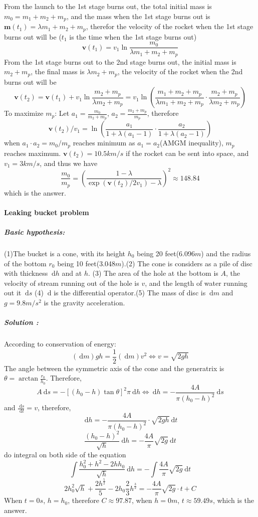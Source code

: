 \documentclass{ctexart}
\newcommand{\df}{\mathrm{~d}}
\begin{document}
From the launch to the 1st stage burns out, the total initial mass is $m_0= m_1 +m_2 + m_p$, and the mass when the 1st stage burns out is $\mathbf{m}(t_1)=\lambda m_1 +m_2 +m_p$, therefor the velocity of the rocket when the 1st stage burns out will be ($t_1$ is the time when the 1st stage burns out)
$$
\mathbf{v}(t_1)= v_1 \ln \frac{m_0}{\lambda m_1 + m_2 +m_p}
$$
From the 1st stage burns out to the 2nd stage burns out, the initial mass is $m_2 + m_p$, the final mass is $\lambda m_2 + m_p$, the velocity of the rocket when the 2nd burns out will be 
$$
\mathbf{v}(t_2) = \mathbf{v}(t_1)+ v_1 \ln \frac{m_2 + m_p}{\lambda m_2 + m_p} = v_1 \ln \left ( \frac{ m_1 + m_2 +m_p}{\lambda m_1 + m_2 +m_p} \cdot \frac{m_2+m_p}{\lambda m_2 + m_p} \right )
$$
To maximize $m_p$:
\newline
\noindent Let $a_1 = \frac{m_0}{m_2+m_p}$, $a_2 = \frac{m_2+m_p}{m_p}$, therefore
$$
\mathbf{v}(t_2)/ v_1= \ln \left( \frac{a_1}{1+\lambda(a_1-1)} \cdot \frac{a_2}{1+\lambda(a_2-1)} \right)
$$
when $a_1 \cdot a_2 = m_0/m_p$ reaches minimum as $a_1 =a_2$(AMGM inequality), $m_p$ reaches maximum.
\newline
\noindent$\mathbf{v}(t_2) = 10.5 km/s$ if the rocket can be sent into space, and $v_1 = 3km/s$, and thus we have
$$
\frac{m_0}{m_p} = \left( \frac{1-\lambda }{\exp(\mathbf{v}(t_2)/2v_1)-\lambda}\right)^2 \approx 148.84
$$
which is the answer.

\paragraph*{Leaking bucket problem}

\subparagraph*{Basic hypothesis:}
(1)The bucket is a cone, with its height $h_0$ being 20 feet(6.096$m$) and the radius of the bottom $r_0$ being 10 feet(3.048$m$).(2) The cone is considers as a pile of disc with thickness $\df h$ and at $h$. (3) The area of the hole at the bottom is $A$, the velocity of stream running out of the hole is $v$, and the length of water running out it $\df s$ (4) $\df$ is the differential operator.(5) The mass of disc is $\df m $ and $g=9.8m/s^2$ is the gravity acceleration.

\subparagraph*{Solution :}
According to conservation of energy:
$$
(\df m)g h=\frac{1}{2}(\df m )v^2 \Longleftrightarrow v = \sqrt{2gh}
$$
The angle between the symmetric axis of the cone and the generatrix is $\theta = \arctan \frac{r_0}{h_0}$. Therefore,
$$
A \df s = -[(h_0-h)\tan \theta ]^2\pi \df h \Longleftrightarrow \df h = -\frac{4A}{\pi (h_0-h)^2} \df s 
$$
and $\frac{\df s}{\df t}= v$, therefore,
$$
\df h = - \frac{4A}{\pi (h_0-h)^2} \cdot \sqrt{2gh} \df t 
$$
$$
\frac{(h_0-h)^2}{\sqrt{h}} \df h = -\frac{4A}{\pi}\sqrt{2g} \df t
$$
do integral on both side of the equation 
$$
\int \frac{h_0^2+h^2-2hh_0}{\sqrt{h}} \df h = -\int \frac{4A}{\pi}\sqrt{2g} \df t
$$
$$
2h_0^2\sqrt{h}+\frac{2h^{\frac{5}{2}}}{5}-2h_0\frac{2}{3}h^\frac{3}{2} = -\frac{4A}{\pi}\sqrt{2g} \cdot t +C
$$
When $t=0s$, $h=h_0$, therefore $C \approx 97.87$, when $h=0 m$, $t \approx 59.49 s$, which is the answer.
\end{document}
